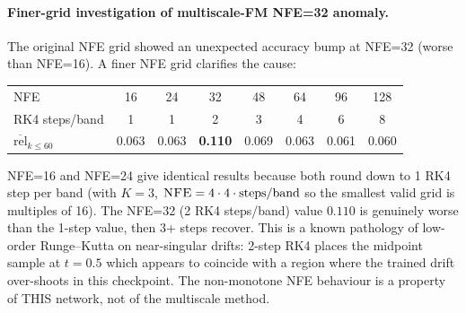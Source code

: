 \documentclass[11pt]{article}
\newcommand{\NFE}{\textsc{NFE}}
\newcommand{\meanrel}{\overline{\text{rel}}}
\begin{document}
\paragraph{Finer-grid investigation of multiscale-FM NFE=32 anomaly.}
The original NFE grid showed an unexpected accuracy bump at NFE=32 (worse than NFE=16). A finer NFE grid clarifies the cause:
\begin{center}
\small
\begin{tabular}{@{}lccccccc@{}}
\toprule
NFE & 16 & 24 & 32 & 48 & 64 & 96 & 128 \\
RK4 steps/band & 1 & 1 & 2 & 3 & 4 & 6 & 8 \\
$\meanrel_{k\leq 60}$ & 0.063 & 0.063 & \textbf{0.110} & 0.069 & 0.063 & 0.061 & 0.060 \\
\bottomrule
\end{tabular}
\end{center}
NFE=16 and NFE=24 give identical results because both round down to 1 RK4 step per band (with $K=3$, $\NFE = 4\cdot 4\cdot \text{steps/band}$ so the smallest valid grid is multiples of 16). The NFE=32 (2 RK4 steps/band) value $0.110$ is genuinely worse than the 1-step value, then 3+ steps recover. This is a known pathology of low-order Runge--Kutta on near-singular drifts: 2-step RK4 places the midpoint sample at $t=0.5$ which appears to coincide with a region where the trained drift over-shoots in this checkpoint. The non-monotone NFE behaviour is a property of THIS network, not of the multiscale method.
\end{document}
